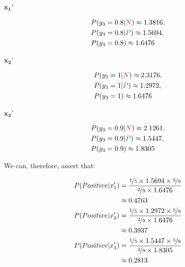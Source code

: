 \documentclass[12pt]{article}
\begin{document}
\begin{enumerate}[leftmargin=\labelsep]
\begin{multicols}{3}
          $\mathbf{x_1'}$

          $$
            \begin{aligned}
               & P(y_3 = 0.8 | \textcolor{purple}{N}) \approx 1.3816, \\
               & P(y_3 = 0.8 | \textcolor{teal}{P}) \approx 1.5694,   \\
               & P(y_3 = 0.8) \approx 1.6476
            \end{aligned}
          $$

          \columnbreak

          $\mathbf{x_2'}$

          $$
            \begin{aligned}
               & P(y_3 = 1 | \textcolor{purple}{N}) \approx 2.3176, \\
               & P(y_3 = 1 | \textcolor{teal}{P}) \approx 1.2972,   \\
               & P(y_3 = 1) \approx 1.6476
            \end{aligned}
          $$

          \columnbreak

          $\mathbf{x_3'}$

          $$
            \begin{aligned}
               & P(y_3 = 0.9 | \textcolor{purple}{N}) \approx 2.1261, \\
               & P(y_3 = 0.9 | \textcolor{teal}{P}) \approx 1.5447,   \\
               & P(y_3 = 0.9) \approx 1.8305
            \end{aligned}
          $$

        \end{multicols}

        \pagebreak

        We can, therefore, assert that:

        \begin{multicols}{2}
          \setlength{\columnseprule}{1pt}
          \def\columnseprulecolor{\color{black}}
          \centering

          \begin{align*}
            P(Positive | x_1') & = \frac{\nicefrac{1}{5} \times 1.5694 \times \nicefrac{5}{9}}{\nicefrac{2}{9} \times 1.6476} \\ &\approx 0.4763 \\
            P(Positive | x_2') & = \frac{\nicefrac{1}{5} \times 1.2972 \times \nicefrac{5}{9}}{\nicefrac{2}{9} \times 1.6476} \\ &\approx 0.3937 \\
            P(Positive | x_3') & = \frac{\nicefrac{1}{5} \times 1.5447 \times \nicefrac{5}{9}}{\nicefrac{3}{9} \times 1.8305} \\ &\approx 0.2813
          \end{align*}


\end{multicols}
\end{enumerate}
\end{document}
